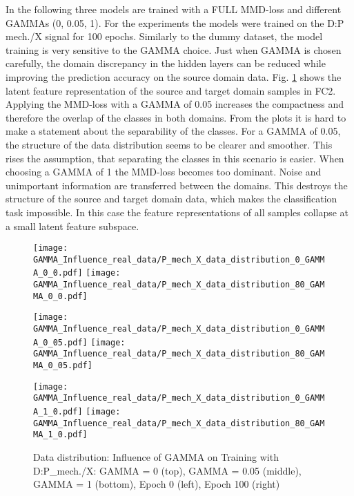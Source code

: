 In the following three models are trained with a FULL MMD-loss and different GAMMAs (0, 0.05, 1). For the experiments the models were trained on the  D:P mech./X signal for 100 epochs. Similarly to the dummy dataset, the model training is very sensitive to the GAMMA choice. Just when GAMMA is chosen carefully, the domain discrepancy in the hidden layers can be reduced while improving the prediction accuracy on the source domain data. Fig. \ref{fig:distribution_GAMMA_influence_real_data} shows the latent feature representation of the source and target domain samples in FC2. Applying the MMD-loss with a GAMMA of 0.05 increases the compactness and therefore the overlap of the classes in both domains. From the plots it is hard to make a statement about the separability of the classes. For a GAMMA of 0.05, the structure of the data distribution seems to be clearer and smoother. This rises the assumption, that separating the classes in this scenario is easier. When choosing a GAMMA of 1 the MMD-loss becomes too dominant. Noise and unimportant information are transferred between the domains. This destroys the structure of the source and target domain data, which makes the classification task impossible. In this case the feature representations of all samples collapse at a small latent feature subspace.

\begin{figure}[htp]
  \centering
  \texttt{[image: GAMMA\_Influence\_real\_data/P\_mech\_X\_data\_distribution\_0\_GAMMA\_0\_0.pdf]}
  \hspace{.4cm}
  \texttt{[image: GAMMA\_Influence\_real\_data/P\_mech\_X\_data\_distribution\_80\_GAMMA\_0\_0.pdf]}

  \vspace{.1cm}

  \texttt{[image: GAMMA\_Influence\_real\_data/P\_mech\_X\_data\_distribution\_0\_GAMMA\_0\_05.pdf]}
  \hspace{.4cm}
  \texttt{[image: GAMMA\_Influence\_real\_data/P\_mech\_X\_data\_distribution\_80\_GAMMA\_0\_05.pdf]}

  \vspace{.1cm}

  \texttt{[image: GAMMA\_Influence\_real\_data/P\_mech\_X\_data\_distribution\_0\_GAMMA\_1\_0.pdf]}
  \hspace{.4cm}
  \texttt{[image: GAMMA\_Influence\_real\_data/P\_mech\_X\_data\_distribution\_80\_GAMMA\_1\_0.pdf]}

  \vspace{.1cm}

  \caption{Data  distribution:  Influence  of  GAMMA  on  Training with D:P\_mech./X:  GAMMA  =  0  (top), GAMMA = 0.05 (middle), GAMMA = 1 (bottom), Epoch 0 (left), Epoch 100 (right)}
  \label{fig:distribution_GAMMA_influence_real_data}
\end{figure}


